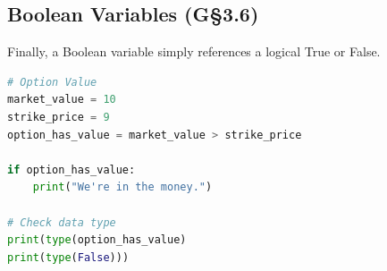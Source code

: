 \subsection{Boolean Variables (G\S 3.6)}

Finally, a Boolean variable simply references a logical True or False.

\begin{lstlisting}[language = Python]
# Option Value
market_value = 10
strike_price = 9
option_has_value = market_value > strike_price

if option_has_value:
    print("We're in the money.")
    
# Check data type
print(type(option_has_value)
print(type(False))) \end{lstlisting}